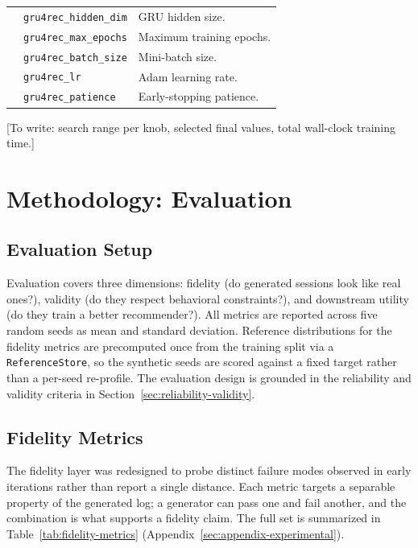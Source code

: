 \documentclass[sigconf,nonacm]{acmart}
\begin{document}
\begin{table}[t]
\begin{tabularx}{\columnwidth}{@{}l l X@{}}
  & \texttt{gru4rec\_hidden\_dim}     & GRU hidden size. \\
  & \texttt{gru4rec\_max\_epochs}     & Maximum training epochs. \\
  & \texttt{gru4rec\_batch\_size}     & Mini-batch size. \\
  & \texttt{gru4rec\_lr}              & Adam learning rate. \\
  & \texttt{gru4rec\_patience}        & Early-stopping patience. \\
\bottomrule
\end{tabularx}
\end{table}

[To write:  search range
per knob, selected final values, total wall-clock training time.]

\section{Methodology: Evaluation}
\label{sec:method-eval}

\subsection{Evaluation Setup}
\label{sec:eval-setup}
Evaluation covers three dimensions: fidelity (do generated
sessions look like real ones?), validity (do they respect
behavioral constraints?), and downstream utility (do they train a
better recommender?). All metrics are reported across five random seeds
as mean and standard deviation. Reference distributions for the fidelity
metrics are precomputed once from the training split via a
\texttt{ReferenceStore}, so the synthetic seeds are scored against a
fixed target rather than a per-seed re-profile. The evaluation design is
grounded in the reliability and validity criteria in
Section~\ref{sec:reliability-validity}.

\subsection{Fidelity Metrics}
\label{sec:fidelity}
The fidelity layer was redesigned to probe distinct failure modes
observed in early iterations rather than report a single distance. Each
metric targets a separable property of the generated log; a generator can
pass one and fail another, and the combination is what supports a
fidelity claim. The full set is summarized in
Table~\ref{tab:fidelity-metrics}
(Appendix~\ref{sec:appendix-experimental}).
\end{document}
